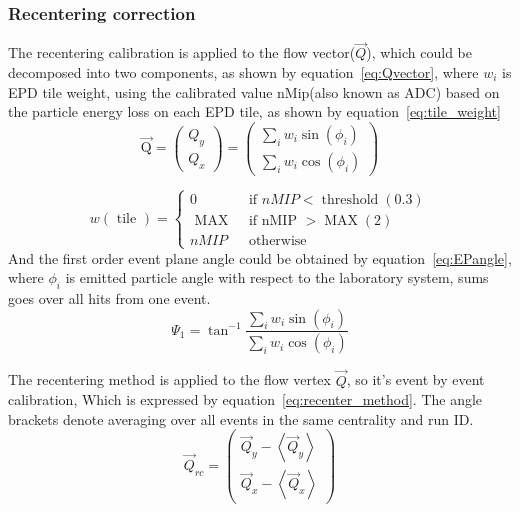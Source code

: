 \subsubsection{Recentering correction}
The recentering calibration is applied to the flow vector($\vec{Q}$), which could be decomposed into 
two components, as shown by equation~\ref{eq:Qvector}, where $w_i$ is EPD tile weight, using the
calibrated value nMip(also known as ADC) based on the particle energy loss on each EPD tile, as shown by equation~\ref{eq:tile_weight}
\begin{equation}
    \overrightarrow{\mathrm{Q}}=\left(\begin{array}{l}
    Q_y \\
    Q_x
    \end{array}\right)=\left(\begin{array}{c}
    \sum_i w_i \sin (\phi_i) \\
    \sum_i w_i \cos (\phi_i)
    \end{array}\right)
\label{eq:Qvector}
\end{equation}

\begin{equation}
    w(\text { tile })= \begin{cases}0 & \text { if } n M I P<\operatorname{threshold}(0.3) \\ \text { MAX } & \text { if nMIP }>\operatorname{MAX}(2) \\ n M I P & \text { otherwise }\end{cases}
\label{eq:tile_weight}
\end{equation}
And the first order event plane angle could be obtained by equation~\ref{eq:EPangle}, where $\phi_i$ is emitted particle angle 
with respect to the laboratory system, sums goes over all hits from one event.
\begin{equation}
    \Psi_1=\tan ^{-1} \frac{\sum_i w_i \sin \left(\phi_i\right)}{\sum_i w_i \cos \left(\phi_i\right)}
\label{eq:EPangle}
\end{equation}

The recentering method is applied to the flow vertex $\vec{Q}$, so it's event by event calibration,
Which is expressed by equation~\ref{eq:recenter_method}. The angle brackets denote averaging over all events
in the same centrality and run ID.
\begin{equation}
    \vec{Q}_{r c}=\left(\begin{array}{l}
    \vec{Q}_y-\left\langle\vec{Q}_y\right\rangle \\
    \vec{Q}_x-\left\langle\vec{Q}_x\right\rangle
    \end{array}\right)
\label{eq:recenter_method}
\end{equation}

